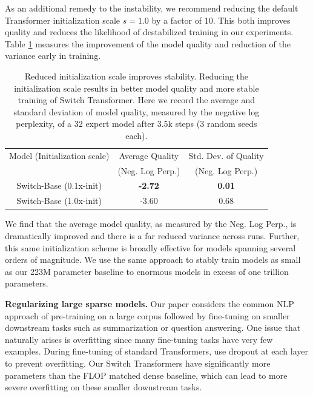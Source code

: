 \documentclass[twoside,11pt]{article}
\begin{document}
As an additional remedy to the instability, we recommend reducing the default Transformer initialization scale $s=1.0$ by a factor of 10.
This both improves quality and reduces the likelihood of destabilized training in our experiments.
Table \ref{tab: init} measures the improvement of the model quality and reduction of the variance early in training.
\begin{table}[!th]
\centering
    \begin{tabular}{ccc}
        \toprule
        Model (Initialization scale) & Average Quality & Std. Dev. of Quality \\ 
         & (Neg. Log Perp.) & (Neg. Log Perp.) \\ \hline
        Switch-Base (0.1x-init) & \textbf{-2.72} & \textbf{0.01} \\
        Switch-Base (1.0x-init) & -3.60 & 0.68 \\
        \bottomrule
    \end{tabular}
    \caption{Reduced initialization scale improves stability. Reducing the initialization scale results in better model quality and more stable training of Switch Transformer. Here we record the average and standard deviation of model quality, measured by the negative log perplexity, of a 32 expert model after 3.5k steps (3 random seeds each).}
    \label{tab: init}
\end{table}
We find that the average model quality, as measured by the Neg. Log Perp., is dramatically improved and there is a far reduced variance across runs.
Further, this same initialization scheme is broadly effective for models spanning several orders of magnitude.
We use the same approach to stably train models as small as our 223M parameter baseline to enormous models in excess of one trillion parameters.

\textbf{Regularizing large sparse models.} Our paper considers the common NLP approach of pre-training on a large corpus followed by fine-tuning on smaller downstream tasks such as summarization or question answering.
One issue that naturally arises is overfitting since many fine-tuning tasks have very few examples.
During fine-tuning of standard Transformers, \citet{raffel2019exploring} use dropout \citep{srivastava2014dropout} at each layer to prevent overfitting.
Our Switch Transformers have significantly more parameters than the FLOP matched dense baseline, which can lead to more severe overfitting on these smaller downstream tasks.
\end{document}
